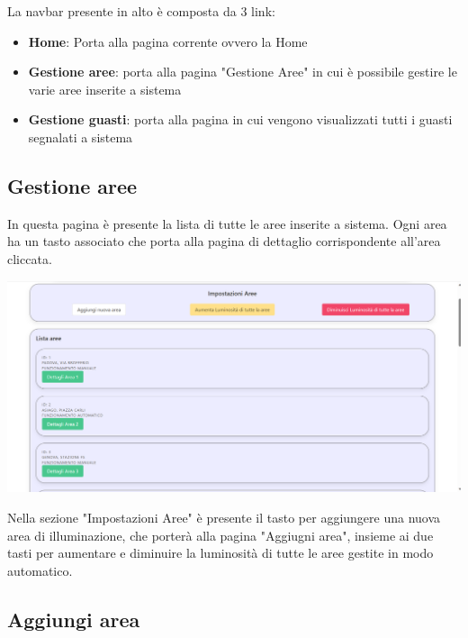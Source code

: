 \documentclass[9pt]{article}
\begin{document}
La navbar presente in alto è composta da 3 link:

\begin{itemize}
	\item \textbf{Home}: Porta alla pagina corrente ovvero la Home
	\item \textbf{Gestione aree}: porta alla pagina "Gestione Aree" in cui è possibile gestire le varie aree inserite a sistema
	\item \textbf{Gestione guasti}: porta alla pagina in cui vengono visualizzati tutti i guasti segnalati a sistema
\end{itemize}

\subsection{Gestione aree}
In questa pagina è presente la lista di tutte le aree inserite a sistema.
Ogni area ha un tasto associato che porta alla pagina di dettaglio corrispondente all'area cliccata.

\begin{center}
	\includegraphics[scale=0.3]{Gestione_aree.png}
\end{center}

Nella sezione "Impostazioni Aree" è presente il tasto per aggiungere una nuova area di illuminazione, che porterà alla pagina "Aggiugni area", insieme ai due tasti per aumentare e diminuire la luminosità di tutte le aree gestite in modo automatico.

\subsection{Aggiungi area}
\end{document}
